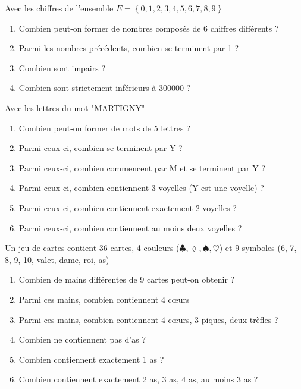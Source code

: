 \begin{exercice}
Avec les chiffres de l'ensemble $E=\left\{ 0,1,2,3,4,5,6,7,8,9 \right\}$
\begin{enumerate}
\item Combien peut-on former de nombres composés de 6 chiffres différents ?
\item Parmi les nombres précédents, combien se terminent par 1 ?
\item Combien sont impairs ? 
\item Combien sont strictement inférieurs à 300000 ? 
\end{enumerate}
\end{exercice}

\begin{exercice}
Avec les lettres du mot "MARTIGNY"
\begin{enumerate}
\item Combien peut-on former de mots de 5 lettres ?
\item Parmi ceux-ci, combien se terminent par Y ?
\item Parmi ceux-ci, combien commencent par M et se terminent par Y ?
\item Parmi ceux-ci, combien contiennent 3 voyelles (Y est une voyelle) ?
\item Parmi ceux-ci, combien contiennent exactement 2 voyelles ?
\item Parmi ceux-ci, combien contiennent au moins deux voyelles ?
\end{enumerate}
\end{exercice}

\begin{exercice}
Un jeu de cartes contient 36 cartes, 4 couleurs ($\clubsuit, \lozenge, \spadesuit, \heartsuit $) et 9 symboles (6, 7, 8, 9, 10, valet, dame, roi, as)
\begin{enumerate}
\item Combien de mains différentes de 9 cartes peut-on obtenir ?
\item Parmi ces mains, combien contiennent 4 cœurs
\item Parmi ces mains, combien contiennent 4 cœurs, 3 piques, deux trèfles ?
\item Combien ne contiennent pas d'as ?
\item Combien contiennent exactement 1 as ?
\item Combien contiennent exactement 2 as, 3 as, 4 as, au moins 3 as ?
\end{enumerate}
\end{exercice}

